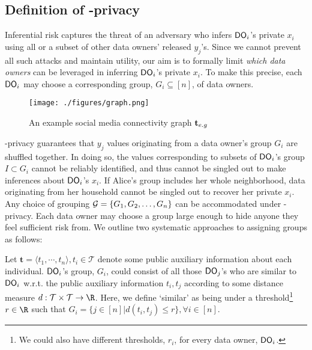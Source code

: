 \subsection{Definition of \name-privacy}\label{sec:privacy:def}
 \vspace{-0.3cm}
Inferential risk captures the threat of an adversary who infers $\textsf{DO}_i$'s private $x_i$ using all or a subset of other data owners' released $y_j$'s. Since we cannot prevent all such attacks and maintain utility, our aim is to formally limit \emph{which data owners} can be leveraged in inferring $\textsf{DO}_i$'s private $x_i$. To make this precise, each $\textsf{DO}_i$ may choose a corresponding group, $G_i \subseteq [n]$, of data owners.
\begin{wrapfigure}{r}{0.3\linewidth}
    \centering
    \vspace{-1.5em}
    \texttt{[image: ./figures/graph.png]}
    \vspace{-1.25em}
    \caption{An example social media connectivity graph $\mathbf{t}_{e.g}$}
    \vspace{-2em}
    \label{fig:example}
\end{wrapfigure}
 \name-privacy guarantees that $y_j$ values originating from a data owner's group $G_i$ are shuffled together. In doing so, the \ldp values corresponding to subsets of $\textsf{DO}_i$'s group $I \subset G_i$ cannot be reliably identified, and thus cannot be singled out to make inferences about $\textsf{DO}_i$'s $x_i$. If Alice's group includes her whole neighborhood, \ldp data originating from her household cannot be singled out to recover her private $x_i$. %
\\Any choice of grouping $\mathcal{G} = \{G_1, G_2, \dots, G_n\}$ can be accommodated under \name-privacy. Each data owner may choose a group large enough to hide anyone they feel sufficient risk from.  We outline two systematic approaches to assigning groups as follows: %
   \vspace{-0.1cm}\squishlistfour    \vspace{-0.1cm}
\item Let $\mathbf{t}=\langle t_1, \cdots, t_n \rangle, t_i \in \mathcal{T}$ denote some public auxiliary information about each individual. $\textsf{DO}_i$'s group, $G_i$, could consist of all those $\textsf{DO}_j$'s who are similar to $\textsf{DO}_i$ w.r.t. the public auxiliary information $t_i, t_j$ according to some distance measure $d:\calT \times \calT \rightarrow \R$. Here, we define `similar' as being under a threshold\footnote{We could also have different thresholds, $r_i$, for every data owner, $\textsf{DO}_i$.} $r \in \R$ such that $G_i = \{j \in [n] \big| d(t_i,t_j) \leq r\},     \forall i \in [n]$.

